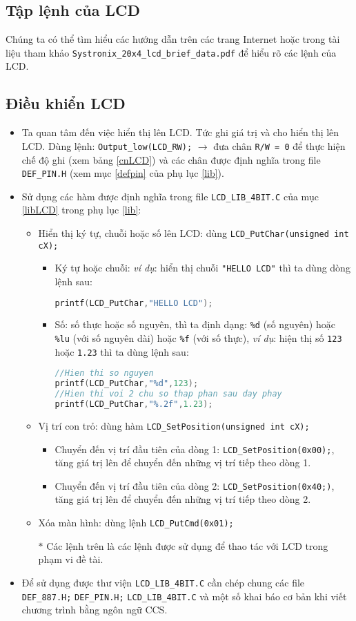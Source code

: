 \subsection{Tập lệnh của LCD}
Chúng ta có thể tìm hiểu các hướng dẫn trên các trang Internet hoặc trong tài liệu tham khảo \verb|Systronix_20x4_lcd_brief_data.pdf| để hiểu rõ các lệnh của LCD.
\subsection{Điều khiển LCD}
\begin{itemize}
\item Ta quan tâm đến việc hiển thị lên LCD. Tức ghi giá trị và cho hiển thị lên LCD. Dùng lệnh: \verb|Output_low(LCD_RW);| $\longrightarrow$ đưa chân \verb|R/W = 0| để thực hiện chế độ ghi (xem bảng \ref{cnLCD}) và các chân được định nghĩa trong file \verb|DEF_PIN.H| (xem mục \ref{defpin} của phụ lục \ref{lib}).
\item Sử dụng các hàm được định nghĩa trong file \verb|LCD_LIB_4BIT.C| của mục \ref{libLCD} trong phụ lục \ref{lib}:
\begin{itemize}
\item Hiển thị ký tự, chuỗi hoặc số lên LCD: dùng \verb|LCD_PutChar(unsigned int cX);|
\begin{itemize}
\item Ký tự hoặc chuỗi: \textit{ví dụ}: hiển thị chuỗi \verb|"HELLO LCD"| thì ta dùng dòng lệnh sau:
\begin{lstlisting}[language=C]
printf(LCD_PutChar,"HELLO LCD");
\end{lstlisting}
\item Số: số thực hoặc số nguyên, thì ta định dạng: \verb|%d| (số nguyên) hoặc \verb|%lu| (với số nguyên dài) hoặc \verb|%f| (với số thực), \textit{ví dụ}: hiện thị số \verb|123| hoặc \verb|1.23| thì ta dùng lệnh sau:
\begin{lstlisting}[language=C]
//Hien thi so nguyen
printf(LCD_PutChar,"%d",123);
//Hien thi voi 2 chu so thap phan sau day phay
printf(LCD_PutChar,"%.2f",1.23); 
\end{lstlisting}
\end{itemize}
\item Vị trí con trỏ: dùng hàm \verb|LCD_SetPosition(unsigned int cX);|
\begin{itemize}
\item Chuyển đến vị trí đầu tiên của dòng 1: \verb|LCD_SetPosition(0x00);|, tăng giá trị lên để chuyển đến những vị trí tiếp theo dòng 1.
\item Chuyển đến vị trí đầu tiên của dòng 2: \verb|LCD_SetPosition(0x40;)|, tăng giá trị lên để chuyển đến những vị trí tiếp theo dòng 2.
\end{itemize}
\item Xóa màn hình: dùng lệnh \verb|LCD_PutCmd(0x01);|
\item[$\ast$] Các lệnh trên là các lệnh được sử dụng để thao tác với LCD trong phạm vi đề tài.
\end{itemize}
\item Để sử dụng được thư viện \verb|LCD_LIB_4BIT.C| cần chép chung các file \verb|DEF_887.H;| \verb|DEF_PIN.H;| \verb|LCD_LIB_4BIT.C| và một số khai báo cơ bản khi viết chương trình bằng ngôn ngữ CCS.
\end{itemize}
